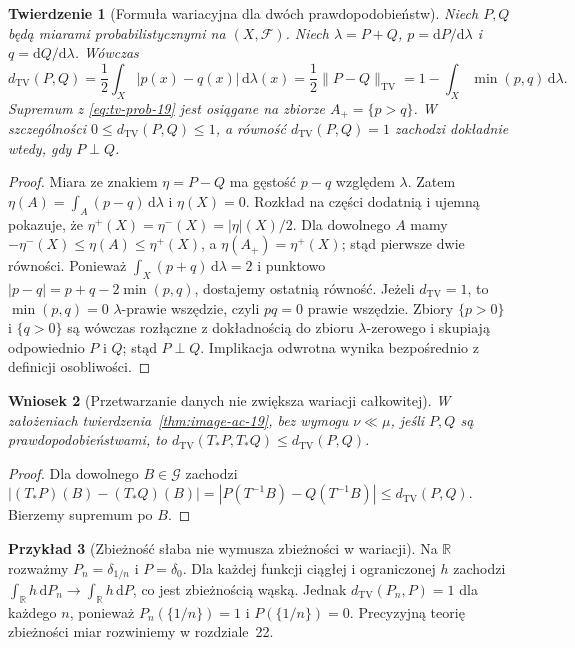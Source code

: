 \documentclass[11pt,a4paper,oneside]{book}
\numberwithin{equation}{chapter}
\theoremstyle{plain}
\newtheorem{twierdzenie}{Twierdzenie}[chapter]
\newtheorem{wniosek}[twierdzenie]{Wniosek}
\theoremstyle{definition}
\newtheorem{przyklad}[twierdzenie]{Przykład}
\theoremstyle{remark}
\begin{document}
\begin{twierdzenie}[Formuła wariacyjna dla dwóch prawdopodobieństw]
\label{thm:total-variation-formula-19}
Niech $P,Q$ będą miarami probabilistycznymi na $(X,\mathcal F)$.
Niech $\lambda=P+Q$, $p=\mathrm dP/\mathrm d\lambda$
i $q=\mathrm dQ/\mathrm d\lambda$. Wówczas
\begin{equation}\label{eq:tv-formula-19}
 d_{\mathrm{TV}}(P,Q)
 =\frac12\int_X|p(x)-q(x)|\,\mathrm d\lambda(x)
 =\frac12\|P-Q\|_{\mathrm{TV}}
 =1-\int_X\min(p,q)\,\mathrm d\lambda.
\end{equation}
Supremum z \eqref{eq:tv-prob-19} jest osiągane na zbiorze
$A_+=\{p>q\}$. W szczególności $0\le d_{\mathrm{TV}}(P,Q)\le1$,
a równość $d_{\mathrm{TV}}(P,Q)=1$ zachodzi dokładnie wtedy,
gdy $P\perp Q$.
\end{twierdzenie}
\begin{proof}
Miara ze znakiem $\eta=P-Q$ ma gęstość $p-q$
względem $\lambda$. Zatem
$\eta(A)=\int_A(p-q)\,\mathrm d\lambda$ i
$\eta(X)=0$. Rozkład na części dodatnią i ujemną
pokazuje, że $\eta^+(X)=\eta^-(X)=|\eta|(X)/2$.
Dla dowolnego $A$ mamy
$-\eta^-(X)\le\eta(A)\le\eta^+(X)$,
a $\eta(A_+)=\eta^+(X)$; stąd pierwsze dwie równości.
Ponieważ $\int_X(p+q)\,\mathrm d\lambda=2$ i punktowo
$|p-q|=p+q-2\min(p,q)$, dostajemy ostatnią równość.
Jeżeli $d_{\mathrm{TV}}=1$, to $\min(p,q)=0$
$\lambda$-prawie wszędzie, czyli $p q=0$ prawie wszędzie.
Zbiory $\{p>0\}$ i $\{q>0\}$ są wówczas rozłączne
z dokładnością do zbioru $\lambda$-zerowego i skupiają
odpowiednio $P$ i $Q$; stąd $P\perp Q$.
Implikacja odwrotna wynika bezpośrednio z definicji osobliwości.
\end{proof}

\begin{wniosek}[Przetwarzanie danych nie zwiększa wariacji całkowitej]
\label{cor:tv-data-processing-19}
W założeniach twierdzenia~\ref{thm:image-ac-19},
bez wymogu $\nu\ll\mu$, jeśli $P,Q$ są prawdopodobieństwami,
to
$ d_{\mathrm{TV}}(T_*P,T_*Q)\le d_{\mathrm{TV}}(P,Q)$.
\end{wniosek}
\begin{proof}
Dla dowolnego $B\in\mathcal G$ zachodzi
$|(T_*P)(B)-(T_*Q)(B)|
=|P(T^{-1}B)-Q(T^{-1}B)|\le d_{\mathrm{TV}}(P,Q)$.
Bierzemy supremum po $B$.
\end{proof}

\begin{przyklad}[Zbieżność słaba nie wymusza zbieżności w wariacji]
Na $\mathbb R$ rozważmy $P_n=\delta_{1/n}$ i $P=\delta_0$.
Dla każdej funkcji ciągłej i ograniczonej $h$
zachodzi $\int_{\mathbb R}h\,\mathrm dP_n\to
\int_{\mathbb R}h\,\mathrm dP$, co jest zbieżnością wąską.
Jednak $d_{\mathrm{TV}}(P_n,P)=1$ dla każdego $n$,
ponieważ $P_n(\{1/n\})=1$ i $P(\{1/n\})=0$.
Precyzyjną teorię zbieżności miar rozwiniemy w rozdziale~22.
\end{przyklad}
\end{document}

